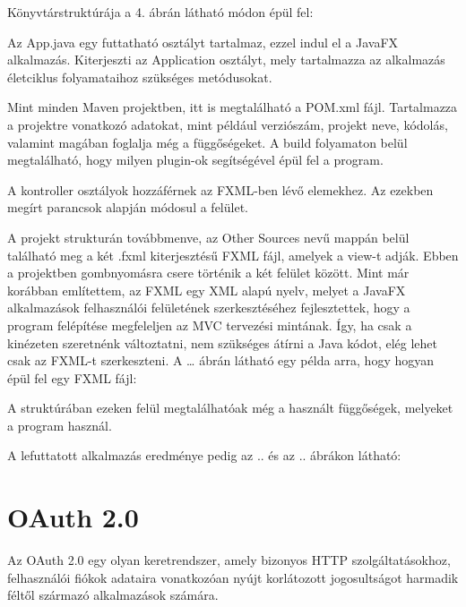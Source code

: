 Könyvtárstruktúrája a 4. ábrán látható módon épül fel: 



Az App.java egy futtatható osztályt tartalmaz, ezzel indul el a JavaFX alkalmazás. Kiterjeszti az Application osztályt, mely tartalmazza az alkalmazás életciklus folyamataihoz szükséges metódusokat. 

Mint minden Maven projektben, itt is megtalálható a POM.xml fájl. Tartalmazza a projektre vonatkozó adatokat, mint például verziószám, projekt neve, kódolás, valamint magában foglalja még a függőségeket. A build folyamaton belül megtalálható, hogy milyen plugin-ok segítségével épül fel a program. 

A kontroller osztályok hozzáférnek az FXML-ben lévő elemekhez. Az ezekben megírt parancsok alapján módosul a felület. 

A projekt strukturán továbbmenve, az Other Sources nevű mappán belül található meg a két .fxml kiterjesztésű FXML fájl, amelyek a view-t adják. Ebben a projektben gombnyomásra csere történik a két felület között. Mint már korábban említettem, az FXML egy XML alapú nyelv, melyet a JavaFX alkalmazások felhasználói felületének szerkesztéséhez fejlesztettek, hogy a program felépítése megfeleljen az MVC tervezési mintának. Így, ha csak a kinézeten szeretnénk változtatni, nem szükséges átírni a Java kódot, elég lehet csak az FXML-t szerkeszteni. A … ábrán látható egy példa arra, hogy hogyan épül fel egy FXML fájl: 


A struktúrában ezeken felül megtalálhatóak még a használt függőségek, melyeket a program használ. 

A lefuttatott alkalmazás eredménye pedig az .. és az .. ábrákon látható:



\section{OAuth 2.0}

Az OAuth 2.0 egy olyan keretrendszer, amely bizonyos HTTP szolgáltatásokhoz, felhasználói fiókok adataira vonatkozóan nyújt korlátozott jogosultságot harmadik féltől származó alkalmazások számára. 

